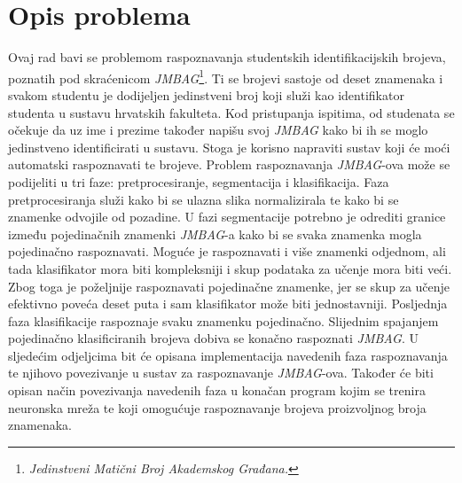 \chapter{Opis problema}
\label{ch:opis-problema}
Ovaj rad bavi se problemom raspoznavanja studentskih identifikacijskih brojeva, poznatih pod skraćenicom
\emph{JMBAG}\footnote{\emph{Jedinstveni Matični Broj Akademskog Građana.}}. Ti se brojevi sastoje od deset znamenaka i
svakom studentu je dodijeljen jedinstveni broj koji služi kao identifikator studenta u sustavu hrvatskih fakulteta.
Kod pristupanja ispitima, od studenata se očekuje da uz ime i prezime također napišu svoj \emph{JMBAG} kako bi ih se
moglo jedinstveno identificirati u sustavu. Stoga je korisno napraviti sustav koji će moći automatski raspoznavati te
brojeve. Problem raspoznavanja \emph{JMBAG}-ova može se podijeliti u tri faze: pretprocesiranje, segmentacija i
klasifikacija. Faza pretprocesiranja služi kako bi se ulazna slika normalizirala te kako bi se znamenke odvojile od
pozadine. U fazi segmentacije potrebno je odrediti granice između pojedinačnih znamenki \emph{JMBAG}-a kako bi se svaka
znamenka mogla pojedinačno raspoznavati. Moguće je raspoznavati i više znamenki odjednom, ali tada klasifikator mora
biti kompleksniji i skup podataka za učenje mora biti veći. Zbog toga je poželjnije raspoznavati pojedinačne znamenke,
jer se skup za učenje efektivno poveća deset puta i sam klasifikator može biti jednostavniji. Posljednja faza
klasifikacije raspoznaje svaku znamenku pojedinačno. Slijednim spajanjem pojedinačno klasificiranih brojeva dobiva se
konačno raspoznati \emph{JMBAG}. U sljedećim odjeljcima bit će opisana implementacija navedenih faza raspoznavanja te
njihovo povezivanje u sustav za raspoznavanje \emph{JMBAG}-ova. Također će biti opisan način povezivanja navedenih faza
u konačan program kojim se trenira neuronska mreža te koji omogućuje raspoznavanje brojeva proizvoljnog broja znamenaka.


